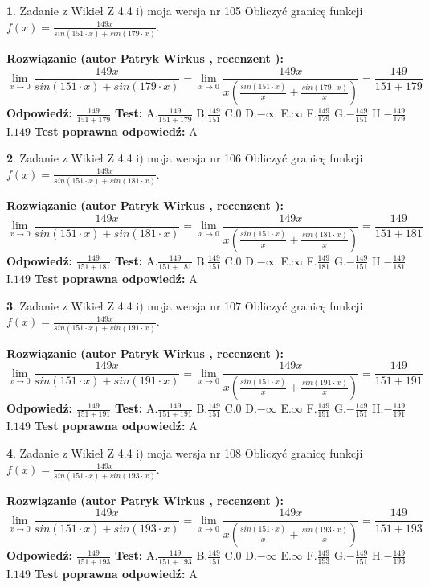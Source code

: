 \documentclass[12pt, a4paper]{article}
\theoremstyle{definition} %
\newtheorem{zad}{}
\newcommand{\zadStart}[1]{\begin{zad}#1\newline}
\newcommand{\zadStop}{\end{zad}}
\newcommand{\rozwStart}[2]{\noindent \textbf{Rozwiązanie (autor #1 , recenzent #2): }\newline}
\newcommand{\rozwStop}{\newline}
\newcommand{\odpStart}{\noindent \textbf{Odpowiedź:}\newline}
\newcommand{\odpStop}{\newline}
\newcommand{\testStart}{\noindent \textbf{Test:}\newline}
\newcommand{\testStop}{\newline}
\newcommand{\kluczStart}{\noindent \textbf{Test poprawna odpowiedź:}\newline}
\newcommand{\kluczStop}{\newline}
\begin{document}
\zadStart{Zadanie z Wikieł Z 4.4 i) moja wersja nr 105}
Obliczyć granicę funkcji $f(x)=\frac{149x}{sin(151\cdot x) +sin(179\cdot x)}$.
\zadStop
\rozwStart{Patryk Wirkus}{}
$$\lim\limits_{x\to 0}\frac{149x}{sin(151\cdot x) +sin(179\cdot x)}=\lim\limits_{x\to 0}\frac{149x}{x(\frac{sin(151\cdot x)}{x}+\frac{sin(179\cdot x)}{x})}=\frac{149}{151+179}$$
\rozwStop
\odpStart
$\frac{149}{151+179}$
\odpStop
\testStart
A.$\frac{149}{151+179}$
B.$\frac{149}{151}$
C.$0$
D.$-\infty$
E.$\infty$
F.$\frac{149}{179}$
G.$-\frac{149}{151}$
H.$-\frac{149}{179}$
I.$149$
\testStop
\kluczStart
A
\kluczStop



\zadStart{Zadanie z Wikieł Z 4.4 i) moja wersja nr 106}
Obliczyć granicę funkcji $f(x)=\frac{149x}{sin(151\cdot x) +sin(181\cdot x)}$.
\zadStop
\rozwStart{Patryk Wirkus}{}
$$\lim\limits_{x\to 0}\frac{149x}{sin(151\cdot x) +sin(181\cdot x)}=\lim\limits_{x\to 0}\frac{149x}{x(\frac{sin(151\cdot x)}{x}+\frac{sin(181\cdot x)}{x})}=\frac{149}{151+181}$$
\rozwStop
\odpStart
$\frac{149}{151+181}$
\odpStop
\testStart
A.$\frac{149}{151+181}$
B.$\frac{149}{151}$
C.$0$
D.$-\infty$
E.$\infty$
F.$\frac{149}{181}$
G.$-\frac{149}{151}$
H.$-\frac{149}{181}$
I.$149$
\testStop
\kluczStart
A
\kluczStop



\zadStart{Zadanie z Wikieł Z 4.4 i) moja wersja nr 107}
Obliczyć granicę funkcji $f(x)=\frac{149x}{sin(151\cdot x) +sin(191\cdot x)}$.
\zadStop
\rozwStart{Patryk Wirkus}{}
$$\lim\limits_{x\to 0}\frac{149x}{sin(151\cdot x) +sin(191\cdot x)}=\lim\limits_{x\to 0}\frac{149x}{x(\frac{sin(151\cdot x)}{x}+\frac{sin(191\cdot x)}{x})}=\frac{149}{151+191}$$
\rozwStop
\odpStart
$\frac{149}{151+191}$
\odpStop
\testStart
A.$\frac{149}{151+191}$
B.$\frac{149}{151}$
C.$0$
D.$-\infty$
E.$\infty$
F.$\frac{149}{191}$
G.$-\frac{149}{151}$
H.$-\frac{149}{191}$
I.$149$
\testStop
\kluczStart
A
\kluczStop



\zadStart{Zadanie z Wikieł Z 4.4 i) moja wersja nr 108}
Obliczyć granicę funkcji $f(x)=\frac{149x}{sin(151\cdot x) +sin(193\cdot x)}$.
\zadStop
\rozwStart{Patryk Wirkus}{}
$$\lim\limits_{x\to 0}\frac{149x}{sin(151\cdot x) +sin(193\cdot x)}=\lim\limits_{x\to 0}\frac{149x}{x(\frac{sin(151\cdot x)}{x}+\frac{sin(193\cdot x)}{x})}=\frac{149}{151+193}$$
\rozwStop
\odpStart
$\frac{149}{151+193}$
\odpStop
\testStart
A.$\frac{149}{151+193}$
B.$\frac{149}{151}$
C.$0$
D.$-\infty$
E.$\infty$
F.$\frac{149}{193}$
G.$-\frac{149}{151}$
H.$-\frac{149}{193}$
I.$149$
\testStop
\kluczStart
A
\kluczStop
\end{document}
